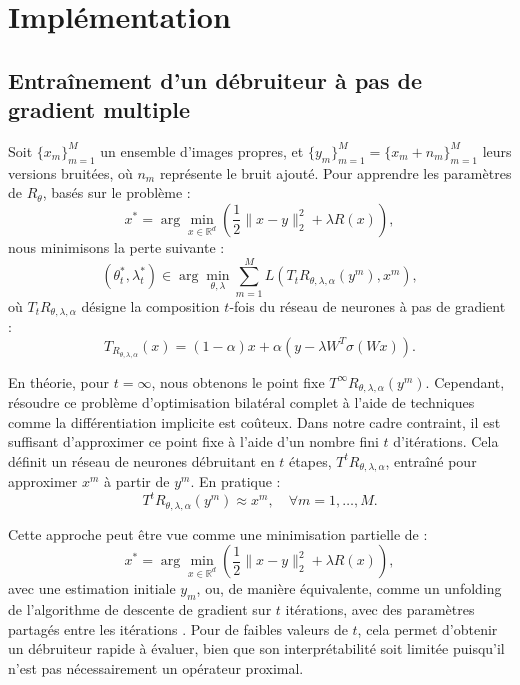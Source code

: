 \documentclass[a4paper, 12pt]{report} %
\begin{document}
\section{Implémentation}

\subsection{Entraînement d'un débruiteur à pas de gradient multiple}

Soit \( \{x_m\}_{m=1}^M \) un ensemble d’images propres, et \( \{y_m\}_{m=1}^M = \{x_m + n_m\}_{m=1}^M \) leurs versions bruitées, où \( n_m \) représente le bruit ajouté. Pour apprendre les paramètres de \( R_\theta \), basés sur le problème :  
\[
x^* = \arg \min_{x \in \mathbb{R}^d} \left( \frac{1}{2} \| x - y \|_2^2 + \lambda R(x) \right),
\]
nous minimisons la perte suivante :  
\[
(\theta^*_t, \lambda^*_t) \in \arg \min_{\theta, \lambda} \sum_{m=1}^M L \left( T_t R_{\theta, \lambda, \alpha}(y^m), x^m \right),
\]
où \( T_t R_{\theta, \lambda, \alpha} \) désigne la composition \( t \)-fois du réseau de neurones à pas de gradient :  
\[
T_{R_{\theta, \lambda, \alpha}}(x) = (1 - \alpha)x + \alpha \left( y - \lambda W^T \sigma(Wx) \right).
\]

En théorie, pour \( t = \infty \), nous obtenons le point fixe \( T^\infty R_{\theta, \lambda, \alpha}(y^m) \). Cependant, résoudre ce problème d’optimisation bilatéral complet à l’aide de techniques comme la différentiation implicite \cite{pramanik2023memory,chen2014insights} est coûteux. Dans notre cadre contraint, il est suffisant d’approximer ce point fixe à l’aide d’un nombre fini \( t \) d’itérations. Cela définit un réseau de neurones débruitant en \( t \) étapes, \( T^t R_{\theta, \lambda, \alpha} \), entraîné pour approximer \( x^m \) à partir de \( y^m \). En pratique :  
\[
T^t R_{\theta, \lambda, \alpha}(y^m) \approx x^m, \quad \forall m = 1, \ldots, M.
\]

Cette approche peut être vue comme une minimisation partielle de :  
\[
x^* = \arg \min_{x \in \mathbb{R}^d} \left( \frac{1}{2} \| x - y \|_2^2 + \lambda R(x) \right),
\]
avec une estimation initiale \( y_m \), ou, de manière équivalente, comme un unfolding de l’algorithme de descente de gradient sur \( t \) itérations, avec des paramètres partagés entre les itérations \cite{aggarwal2018modl,pramanik2020deep}. Pour de faibles valeurs de \( t \), cela permet d’obtenir un débruiteur rapide à évaluer, bien que son interprétabilité soit limitée puisqu’il n’est pas nécessairement un opérateur proximal.
\end{document}
